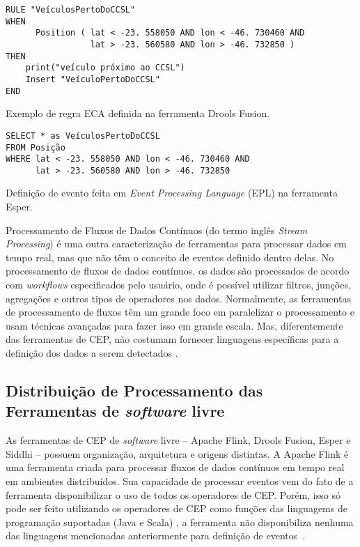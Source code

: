 \begin{evento}[t]
\begin{verbatim}
RULE "VeículosPertoDoCCSL"
WHEN 
      Position ( lat < -23. 558050 AND lon < -46. 730460 AND
                 lat > -23. 560580 AND lon > -46. 732850 )
THEN
    print("veículo próximo ao CCSL")
    Insert "VeículoPertoDoCCSL"
END                
\end{verbatim}
\caption{Exemplo de regra ECA definida na ferramenta Drools Fusion. }
\label{ECAruleexample}
\end{evento}

\begin{evento}[b]
\begin{verbatim}
SELECT * as VeículosPertoDoCCSL
FROM Posição
WHERE lat < -23. 558050 AND lon < -46. 730460 AND
      lat > -23. 560580 AND lon > -46. 732850
\end{verbatim}
\caption{Definição de evento feita em \textit{Event Processing Language} (EPL) na ferramenta Esper.}
\label{EPLexample}
\end{evento}

Processamento de Fluxos de Dados Contínuos (do termo inglês \textit{Stream Processing}) é uma outra caracterização de ferramentas para processar dados em tempo real, mas que não têm o conceito de eventos definido dentro delas. No processamento de fluxos de dados contínuos, os dados são processados de acordo com \textit{workflows} especificados pelo usuário, onde é possível utilizar filtros, junções, agregações e outros tipos de operadores nos dados. Normalmente, as ferramentas de processamento de fluxos têm um grande foco em  paralelizar o processamento e usam técnicas avançadas para fazer isso em grande escala. Mas, diferentemente das ferramentas de CEP, não costumam fornecer linguagens específicas para a definição dos dados a serem detectados \citep{Margara:2011:PFI:2002259.2002307}.

\subsection{Distribuição de Processamento das Ferramentas de \textit{software} livre}
\label{sub-sec:opensourcetoolsdistribution}

As ferramentas de CEP de \textit{software} livre -- Apache Flink, Drools Fusion, Esper e Siddhi -- possuem organização, arquitetura e origens distintas. A Apache Flink é uma ferramenta criada para processar fluxos de dados contínuos em tempo real em ambientes distribuídos. Sua capacidade de processar eventos vem do fato de a ferramenta disponibilizar o uso de todos os operadores de CEP. Porém, isso só pode ser feito utilizando os operadores de CEP como funções das linguagems de programação suportadas (Java e Scala)%
, a ferramenta não disponibiliza nenhuma das linguagens mencionadas anteriormente para definição de eventos~\citep{FlinkCEP}.

